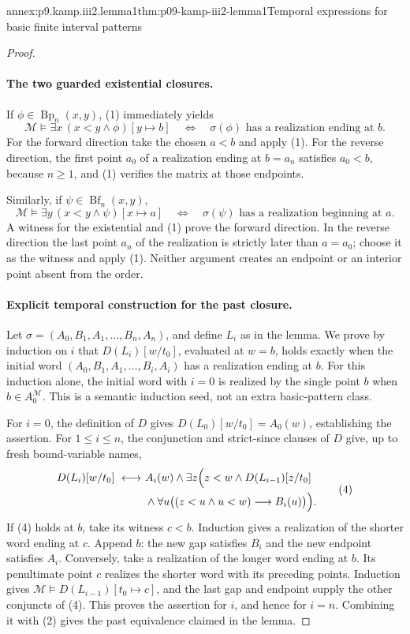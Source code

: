 \begin{annexitem}{annex:p9.kamp.iii2.lemma1}{thm:p09-kamp-iii2-lemma1}{Temporal expressions for basic finite interval patterns}
\begin{proof}
\paragraph{The two guarded existential closures.}
If \(\phi\in\operatorname{Bp}_n(x,y)\), (1) immediately yields
\[
 \mathcal M\models\exists x\,(x<y\land\phi)[y\mapsto b]
 \quad\Longleftrightarrow\quad
 \text{\(\sigma(\phi)\) has a realization ending at \(b\)}.
 \tag{2}
\]
For the forward direction take the chosen \(a<b\) and apply (1).
For the reverse direction, the first point \(a_0\) of a realization
ending at \(b=a_n\) satisfies \(a_0<b\), because \(n\geq1\),
and (1) verifies the matrix at those endpoints.

Similarly, if \(\psi\in\operatorname{Bf}_n(x,y)\),
\[
 \mathcal M\models\exists y\,(x<y\land\psi)[x\mapsto a]
 \quad\Longleftrightarrow\quad
 \text{\(\sigma(\psi)\) has a realization beginning at \(a\)}.
 \tag{3}
\]
A witness for the existential and (1) prove the forward direction.  In
the reverse direction the last point \(a_n\) of the realization is
strictly later than \(a=a_0\); choose it as the witness and apply (1).
Neither argument creates an endpoint or an interior point absent from the
order.

\paragraph{Explicit temporal construction for the past closure.}
Let \(\sigma=(A_0,B_1,A_1,\ldots,B_n,A_n)\), and define \(L_i\)
as in the lemma.  We prove by induction on \(i\) that
\(D(L_i)[w/t_0]\), evaluated at \(w=b\), holds exactly when the
initial word \((A_0,B_1,A_1,\ldots,B_i,A_i)\) has a realization
ending at \(b\).  For this induction alone, the initial word with
\(i=0\) is realized by the single point \(b\) when
\(b\in A_0^{\mathcal M}\).  This is a semantic induction seed,
not an extra basic-pattern class.

For \(i=0\), the definition of \(D\) gives
\(D(L_0)[w/t_0]=A_0(w)\), establishing the assertion.  For
\(1\leq i\leq n\), the conjunction and strict-since clauses of \(D\)
give, up to fresh bound-variable names,
\[
\begin{split}
 D(L_i)[w/t_0]\ \longleftrightarrow\ 
 &A_i(w)\land\exists z\Bigl(z<w\land D(L_{i-1})[z/t_0]\\
 &{}\land\forall u\bigl((z<u\land u<w)
                            \longrightarrow B_i(u)\bigr)\Bigr).
\end{split}
\tag{4}
\]
If (4) holds at \(b\), take its witness \(c<b\).  Induction gives
a realization of the shorter word ending at \(c\).  Append \(b\):
the new gap satisfies \(B_i\) and the new endpoint satisfies \(A_i\).
Conversely, take a realization of the longer word ending at \(b\).
Its penultimate point \(c\) realizes the shorter word with its preceding
points.  Induction gives
\(\mathcal M\models D(L_{i-1})[t_0\mapsto c]\), and the last gap and
endpoint supply the other conjuncts of (4).  This proves the assertion
for \(i\), and hence for \(i=n\).  Combining it with (2) gives the
past equivalence claimed in the lemma.


\end{proof}
\end{annexitem}
